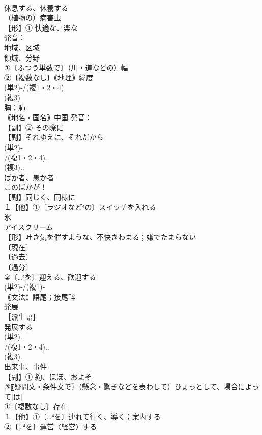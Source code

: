 \documentclass[8pt]{extreport}
\begin{document}
\begin{CJK}{UTF8}{min}
\\	休息する、休養する
\\	（植物の）病害虫 
\\	【形】① 快適な、楽な 
\\	発音：
\\	地域、区域 
\\	領域、分野
\\	①〔ふつう単数で〕（川・道などの）幅 
\\	②〔複数なし〕｟地理｠緯度 
\\	(単2)‐/(複1・2・4)
\\	(複3)
\\	胸；肺 
\\	｟地名・国名｠中国 発音：
\\	【副】② その際に
\\	【副】それゆえに、それだから 
\\	(単2)‐
\\	/(複1・2・4)..
\\	(複3)..
\\	ばか者、愚か者 
\\	このばかが！
\\	【副】同じく、同様に
\\	１【他】①〔ラジオなど⁴の〕スイッチを入れる 
\\	氷 
\\	アイスクリーム
\\	【形】吐き気を催すような、不快きわまる；嫌でたまらない 
\\	〔現在〕
\\	〔過去〕
\\	〔過分〕
\\	②〔…⁴を〕迎える、歓迎する
\\	(単2)‐/(複1)‐
\\	｟文法｠語尾；接尾辞 
\\	発展 
\\	［派生語］ 
\\	発展する
\\	(単2)..
\\	/(複1・2・4)..
\\	(複3)..
\\	出来事、事件 
\\	【副】① 約、ほぼ、およそ 
\\	③〖疑問文・条件文で〗（懸念・驚きなどを表わして）ひょっとして、場合によって[は]
\\	①〔複数なし〕存在 
\\	１【他】①〔…⁴を〕連れて行く、導く；案内する 
\\	②〔…⁴を〕運営〈経営〉する　

\end{CJK}
\end{document}
